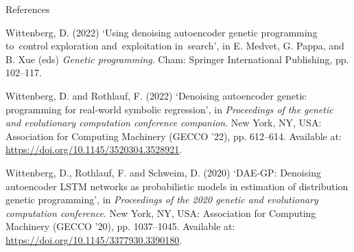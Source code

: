 \documentclass[
  ignorenonframetext,
]{beamer}
\newlength{\cslhangindent}
\newlength{\cslentryspacingunit} %
\newenvironment{CSLReferences}[2] %
 {%
  \setlength{\parindent}{0pt}
  \ifodd #1
  \let\oldpar\par
  \def\par{\hangindent=\cslhangindent\oldpar}
  \fi
  \setlength{\parskip}{#2\cslentryspacingunit}
 }%
 {}
\begin{document}
\begin{frame}[allowframebreaks]{References}
\begin{CSLReferences}{0}{0}
\leavevmode{}%
Wittenberg, D. (2022) {`Using denoising autoencoder genetic programming
to~control exploration and~exploitation in~search'}, in E. Medvet, G.
Pappa, and B. Xue (eds) \emph{Genetic programming}. Cham: Springer
International Publishing, pp. 102--117.

\leavevmode{}%
Wittenberg, D. and Rothlauf, F. (2022) {`Denoising autoencoder genetic
programming for real-world symbolic regression'}, in \emph{Proceedings
of the genetic and evolutionary computation conference companion}. New
York, NY, USA: Association for Computing Machinery (GECCO '22), pp.
612--614. Available at: \url{https://doi.org/10.1145/3520304.3528921}.

\leavevmode{}%
Wittenberg, D., Rothlauf, F. and Schweim, D. (2020) {`DAE-GP: Denoising
autoencoder LSTM networks as probabilistic models in estimation of
distribution genetic programming'}, in \emph{Proceedings of the 2020
genetic and evolutionary computation conference}. New York, NY, USA:
Association for Computing Machinery (GECCO '20), pp. 1037--1045.
Available at: \url{https://doi.org/10.1145/3377930.3390180}.

\end{CSLReferences}
\end{frame}
\end{document}
